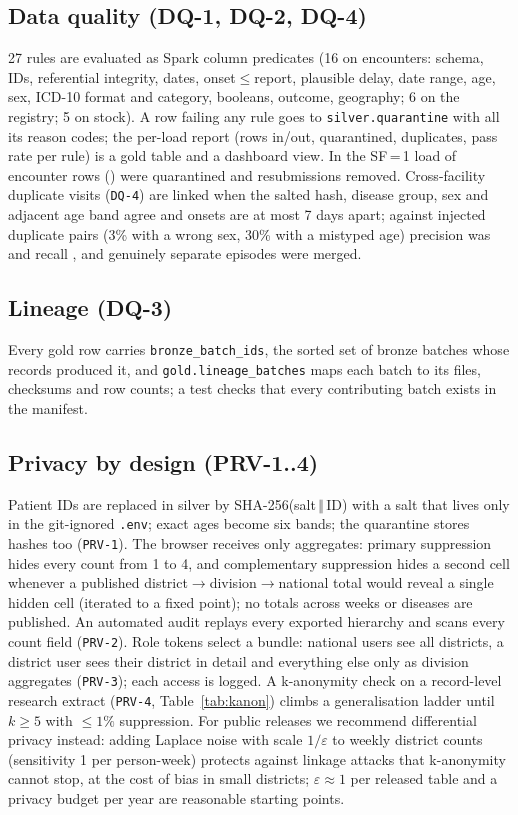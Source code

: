 \documentclass[conference]{IEEEtran}
\newcommand{\req}[1]{\texttt{#1}}
\begin{document}
\subsection{Data quality (DQ-1, DQ-2, DQ-4)}\label{sec:dq}
27 rules are evaluated as Spark column predicates (16 on encounters: schema, IDs, referential integrity,
dates, onset$\leq$report, plausible delay, date range, age, sex, ICD-10 format and category, booleans, outcome,
geography; 6 on the registry; 5 on stock). A row failing any rule goes to \texttt{silver.quarantine} with all
its reason codes; the per-load report (rows in/out, quarantined, duplicates, pass rate per rule) is a gold
table and a dashboard view. In the SF\,=\,1 load \DqQuarantined{} of \DqRowsIn{} encounter rows
(\DqQuarPct{}) were quarantined and \DqDupRemoved{} resubmissions removed. Cross-facility duplicate visits
(\req{DQ-4}) are linked when the salted hash, disease group, sex and adjacent age band agree and onsets are
at most 7 days apart; against \DedupTrue{} injected duplicate pairs (3\% with a wrong sex, 30\% with a
mistyped age) precision was \DedupPrecision{} and recall \DedupRecall{}, and \DedupWrongMerge{} genuinely
separate episodes were merged.

\subsection{Lineage (DQ-3)}
Every gold row carries \texttt{bronze\_batch\_ids}, the sorted set of bronze batches whose records produced
it, and \texttt{gold.lineage\_batches} maps each batch to its files, checksums and row counts; a test checks
that every contributing batch exists in the manifest.

\subsection{Privacy by design (PRV-1..4)}\label{sec:privacy}
Patient IDs are replaced in silver by SHA-256(salt\,$\Vert$\,ID) with a salt that lives only in the
git-ignored \texttt{.env}; exact ages become six bands; the quarantine stores hashes too (\req{PRV-1}). The
browser receives only aggregates: primary suppression hides every count from 1 to 4, and complementary
suppression hides a second cell whenever a published district$\rightarrow$division$\rightarrow$national total
would reveal a single hidden cell (iterated to a fixed point); no totals across weeks or diseases are
published. An automated audit replays every exported hierarchy and scans every count field
(\req{PRV-2}). Role tokens select a bundle: national users see all districts, a district user sees their
district in detail and everything else only as division aggregates (\req{PRV-3}); each access is logged.
A k-anonymity check on a record-level research extract (\req{PRV-4}, Table~\ref{tab:kanon}) climbs a
generalisation ladder until $k\geq5$ with $\leq1\%$ suppression. For public releases we recommend
differential privacy instead: adding Laplace noise with scale $1/\varepsilon$ to weekly district counts
(sensitivity 1 per person-week) protects against linkage attacks that k-anonymity cannot stop, at the cost
of bias in small districts; $\varepsilon\approx1$ per released table and a privacy budget per year are
reasonable starting points.
\end{document}
